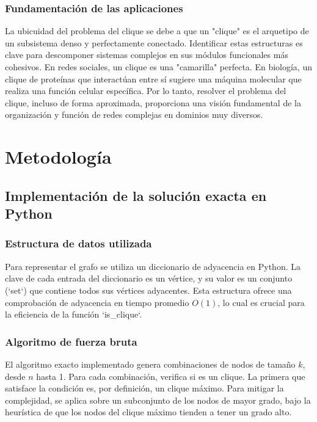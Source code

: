 \documentclass[12pt,a4paper]{report}
\begin{document}
\subsection{Fundamentación de las aplicaciones}
La ubicuidad del problema del clique se debe a que un "clique" es el arquetipo de un subsistema denso y perfectamente conectado. Identificar estas estructuras es clave para descomponer sistemas complejos en sus módulos funcionales más cohesivos. En redes sociales, un clique es una "camarilla" perfecta. En biología, un clique de proteínas que interactúan entre sí sugiere una máquina molecular que realiza una función celular específica. Por lo tanto, resolver el problema del clique, incluso de forma aproximada, proporciona una visión fundamental de la organización y función de redes complejas en dominios muy diversos.

\newpage

\chapter{Metodología}

\section{Implementación de la solución exacta en Python}
\subsection{Estructura de datos utilizada}
Para representar el grafo se utiliza un diccionario de adyacencia en Python. La clave de cada entrada del diccionario es un vértice, y su valor es un conjunto (`set`) que contiene todos sus vértices adyacentes. Esta estructura ofrece una comprobación de adyacencia en tiempo promedio $O(1)$, lo cual es crucial para la eficiencia de la función `is_clique`.

\subsection{Algoritmo de fuerza bruta}
El algoritmo exacto implementado genera combinaciones de nodos de tamaño $k$, desde $n$ hasta 1. Para cada combinación, verifica si es un clique. La primera que satisface la condición es, por definición, un clique máximo. Para mitigar la complejidad, se aplica sobre un subconjunto de los nodos de mayor grado, bajo la heurística de que los nodos del clique máximo tienden a tener un grado alto.
\end{document}
